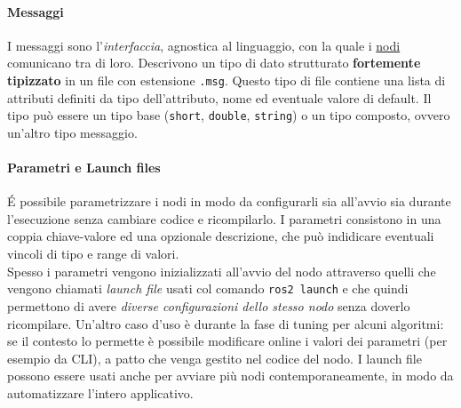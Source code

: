 \paragraph{Messaggi}
\label{ros:msgs}
I messaggi sono l'\textit{interfaccia}, agnostica al linguaggio, con la quale i \hyperref[ros:nodes]{nodi}
comunicano tra di loro. Descrivono un tipo di dato strutturato \textbf{fortemente tipizzato} in un
file con estensione \verb|.msg|. Questo tipo di file contiene una lista di attributi definiti da
tipo dell'attributo, nome ed eventuale valore di default. Il tipo può essere un tipo base
(\verb|short|, \verb|double|, \verb|string|) o un tipo composto, ovvero un'altro tipo messaggio.

\paragraph{Parametri e Launch files}
É possibile parametrizzare i nodi in modo da configurarli sia all'avvio sia durante l'esecuzione
senza cambiare codice e ricompilarlo. I parametri consistono in una coppia chiave-valore ed una
opzionale descrizione, che può indidicare eventuali vincoli di tipo e range di valori.\\
Spesso i parametri vengono inizializzati all'avvio del nodo attraverso quelli che vengono chiamati
\textit{launch file} usati col comando \verb|ros2 launch| e che quindi permettono di avere \textit{diverse
configurazioni dello stesso nodo} senza doverlo ricompilare. Un'altro caso d'uso è durante la fase di
tuning per alcuni algoritmi: se il contesto lo permette è possibile modificare online i valori dei
parametri (per esempio da CLI), a patto che venga gestito nel codice del nodo.
I launch file possono essere usati anche per avviare più nodi contemporaneamente, in modo da
automatizzare l'intero applicativo.


